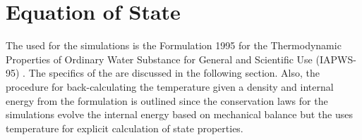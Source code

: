 \newcommand{\phiR} {\ensuremath{\phi\sups{\textsc{r}}}\xspace}
\newcommand{\phiI} {\ensuremath{\phi\sups{\textsc{i}}}\xspace}
\newcommand{\phiRd}{\ensuremath{    \pderiv{\phiR}{\delta}   }\xspace}
\newcommand{\phiId}{\ensuremath{    \pderiv{\phiI}{\delta}   }\xspace}
\newcommand{\phiRt}{\ensuremath{    \pderiv{\phiR}{\tau  }   }\xspace}
\newcommand{\phiIt}{\ensuremath{    \pderiv{\phiI}{\tau  }   }\xspace}
\newcommand{\phid}{\ensuremath{     \pderiv{\phi} {\delta}   }\xspace}
\newcommand{\phit}{\ensuremath{     \pderiv{\phi} {\tau  }   }\xspace}
\newcommand{\Helm} {\ensuremath{\phi (\delta,\tau)}\xspace}
\newcommand{\HelmI}{\ensuremath{\phiI(\delta,\tau)}\xspace}
\newcommand{\HelmR}{\ensuremath{\phiR(\delta,\tau)}\xspace}



\label{Appendix:THProperties}

\section{Equation of State}\label{Section:EOS}

The  used for the simulations is the  Formulation 1995 for the Thermodynamic Properties of Ordinary Water Substance for General and Scientific Use (IAPWS-95) \cite{iapws_revised_2009}.
The specifics of the  are discussed in the following section.
Also, the procedure for back-calculating the temperature given a density and internal energy from the formulation is outlined since the conservation laws for the simulations evolve the internal energy based on mechanical balance but the  uses temperature for explicit calculation of state properties.

